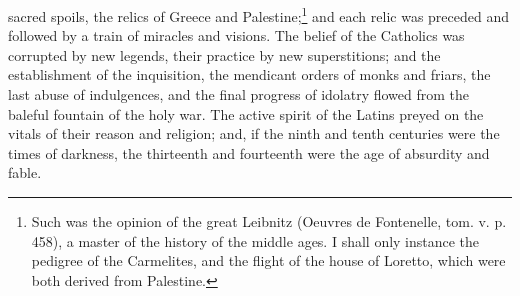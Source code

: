 sacred spoils, the relics of Greece and Palestine;\footnote{Such was the opinion of the great Leibnitz (Oeuvres de Fontenelle, tom. v. p. 458), a master of the history of the middle ages. I shall only instance the pedigree of the Carmelites, and the flight of the house of Loretto, which were both derived from Palestine.} and each relic was preceded and followed by a train of miracles and visions. The belief of the Catholics was corrupted by new legends, their practice by new superstitions; and the establishment of the inquisition, the mendicant orders of monks and friars, the last abuse of indulgences, and the final progress of idolatry flowed from the baleful fountain of the holy war. The active spirit of the Latins preyed on the vitals of their reason and religion; and, if the ninth and tenth centuries were the times of darkness, the thirteenth and fourteenth were the age of absurdity and fable.

